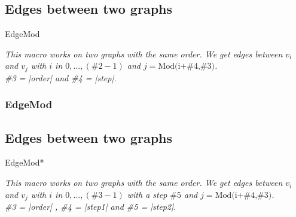 \newpage  
\subsection{Edges between two graphs }%
\begin{NewMacroBox}{EdgeMod}{}

\medskip
\emph{This macro works on two graphs with the same order. We get edges between $v_i$ and $v_j$ with $i$ in $0,...,(\text{\#2}-1)$  and $j=\text{Mod(i+\#4,\#3)}$.\\
\#3 = |order| and  \#4 = |step|.}
\end{NewMacroBox}  

\subsubsection{EdgeMod}
\begin{center}
\begin{tkzexample}[vbox]
\end{tkzexample}
\end{center}

\newpage  
\subsection{Edges between two graphs }%
\begin{NewMacroBox}{EdgeMod*}{}

\medskip
\emph{This macro works on two graphs with the same order. We get edges between $v_i$ and $v_j$ with $i$ in $0,...,(\text{\#3}-1)$ with a step $\text{\#5}$ and $j=\text{Mod(i+\#4,\#3)}$.\\
\#3 = |order| ,  \#4 = |step1| and \#5 = |step2|.}
\end{NewMacroBox}  


\subsubsection{ }%
\begin{center}
\begin{tkzexample}[vbox]
\end{tkzexample}
\end{center}


